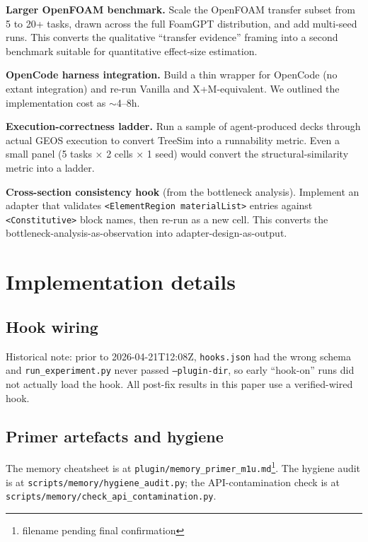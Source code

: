 \documentclass{article}
\begin{document}
\textbf{Larger OpenFOAM benchmark.} Scale the OpenFOAM transfer subset from 5 to 20+ tasks, drawn across the full FoamGPT distribution, and add multi-seed runs. This converts the qualitative ``transfer evidence'' framing into a second benchmark suitable for quantitative effect-size estimation.

\textbf{OpenCode harness integration.} Build a thin wrapper for OpenCode (no extant integration) and re-run Vanilla and X+M-equivalent. We outlined the implementation cost as $\sim$4--8h.

\textbf{Execution-correctness ladder.} Run a sample of agent-produced decks through actual GEOS execution to convert TreeSim into a runnability metric. Even a small panel (5 tasks × 2 cells × 1 seed) would convert the structural-similarity metric into a ladder.

\textbf{Cross-section consistency hook} (from the bottleneck analysis). Implement an adapter that validates \texttt{<ElementRegion materialList>} entries against \texttt{<Constitutive>} block names, then re-run as a new cell. This converts the bottleneck-analysis-as-observation into adapter-design-as-output.

\section{Implementation details}
\label{app:impl}

\subsection{Hook wiring}
Historical note: prior to 2026-04-21T12:08Z, \texttt{hooks.json} had the wrong schema and \texttt{run\_experiment.py} never passed \texttt{--plugin-dir}, so early ``hook-on'' runs did not actually load the hook. All post-fix results in this paper use a verified-wired hook.

\subsection{Primer artefacts and hygiene}
The memory cheatsheet is at \texttt{plugin/memory\_primer\_m1u.md}\footnote{filename pending final confirmation}. The hygiene audit is at \texttt{scripts/memory/hygiene\_audit.py}; the API-contamination check is at \texttt{scripts/memory/check\_api\_contamination.py}.
\end{document}
